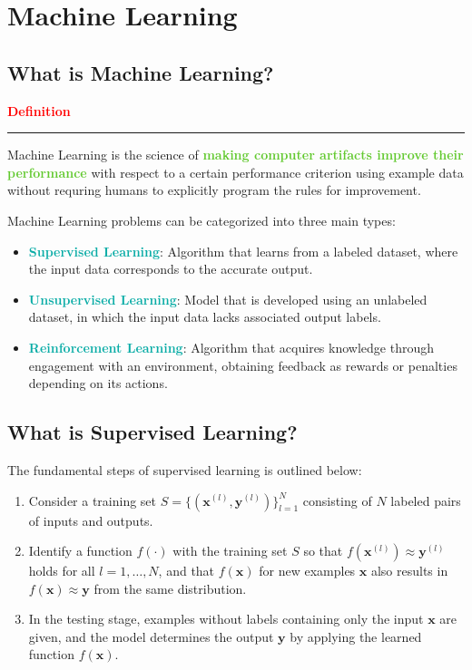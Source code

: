\documentclass[twoside]{article}
\newcommand{\definition}[1]{\begin{definitionbox} \textcolor{red}{{\scriptsize\faStar} \textbf{Definition}} \newline \rule{\textwidth}{0.5pt}  \newline #1 \end{definitionbox}}
\newcommand{\highlightbluetext}[1]{\textcolor[HTML]{09ACA6}{\textbf{#1}}}
\newcommand{\highlightgreentext}[1]{\textcolor[HTML]{62C92F}{\textbf{#1}}}
\numberwithin{equation}{section}
\begin{document}
	\fancyfoot{}

	\fancyfoot[RO, LE]{\thepage}
	
	\setcounter{page}{1}
	
	\tableofcontents
	
	\newpage
	
	\section{Machine Learning}
	\label{sec:MachineLearning}
	
	\subsection{What is Machine Learning?}
	\label{subsec:WhatIsMachineLearning}

	\definition{Machine Learning is the science of \highlightgreentext{making computer artifacts improve their performance} with respect to a certain performance criterion using example data without requring humans to explicitly program the rules for improvement.}
	
	Machine Learning problems can be categorized into three main types:
	\begin{itemize}
		\item \highlightbluetext{Supervised Learning}: Algorithm that learns from a labeled dataset, where the input data corresponds to the accurate output.
		\item \highlightbluetext{Unsupervised Learning}: Model that is developed using an unlabeled dataset, in which the input data lacks associated output labels.
		\item \highlightbluetext{Reinforcement Learning}: Algorithm that acquires knowledge through engagement with an environment, obtaining feedback as rewards or penalties depending on its actions.
	\end{itemize}

	\subsection{What is Supervised Learning?}
	\label{subsec:WhatIsSupervisedLearning}
	The fundamental steps of supervised learning is outlined below:
	\begin{enumerate}
		\item Consider a training set $S = \{(\mathbf{x}^{(l)}, \mathbf{y}^{(l)})\}_{l=1}^N$ consisting of $N$ labeled pairs of inputs and outputs. 
		\item Identify a function $f(\cdot)$ with the training set $S$ so that $f(\mathbf{x}^{(l)}) \approx \mathbf{y}^{(l)}$ holds for all $l = 1, \ldots, N$, and that $f(\mathbf{x})$ for new examples $\mathbf{x}$ also results in $f(\mathbf{x}) \approx \mathbf{y}$ from the same distribution. 
		\item In the testing stage, examples without labels containing only the input $\mathbf{x}$ are given, and the model determines the output $\mathbf{y}$ by applying the learned function $f(\mathbf{x})$.
	\end{enumerate}
\end{document}
